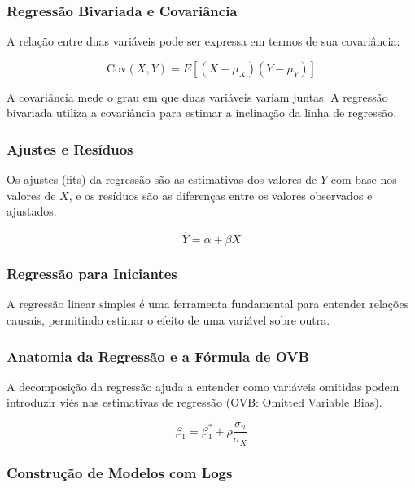 \documentclass[a4paper,12pt]{article}[abntex2]
\begin{document}
\subsubsection*{Regressão Bivariada e Covariância}

A relação entre duas variáveis pode ser expressa em termos de sua covariância:

\begin{equation}
    \text{Cov}(X, Y) = E[(X - \mu_X)(Y - \mu_Y)]
\end{equation}

A covariância mede o grau em que duas variáveis variam juntas. A regressão bivariada utiliza a covariância para estimar a inclinação da linha de regressão.

\subsubsection*{Ajustes e Resíduos}

Os ajustes (fits) da regressão são as estimativas dos valores de \(Y\) com base nos valores de \(X\), e os resíduos são as diferenças entre os valores observados e ajustados.

\begin{equation}
    \hat{Y} = \alpha + \beta X
\end{equation}

\subsubsection*{Regressão para Iniciantes}

A regressão linear simples é uma ferramenta fundamental para entender relações causais, permitindo estimar o efeito de uma variável sobre outra.

\subsubsection*{Anatomia da Regressão e a Fórmula de OVB}

A decomposição da regressão ajuda a entender como variáveis omitidas podem introduzir viés nas estimativas de regressão (OVB: Omitted Variable Bias).

\begin{equation}
    \beta_{1} = \beta_{1}^* + \rho \frac{\sigma_{u}}{\sigma_{X}}
\end{equation}

\subsubsection*{Construção de Modelos com Logs}
\end{document}
